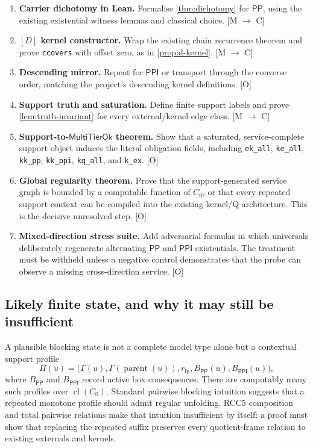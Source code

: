 \documentclass[11pt,letterpaper]{article}
\newcommand{\PP}{\ensuremath{\mathsf{PP}}}
\newcommand{\PPI}{\ensuremath{\mathsf{PPI}}}
\newcommand{\cl}{\operatorname{cl}}
\newcommand{\MultiTierOk}{\ensuremath{\mathsf{MultiTierOk}}}
\newcommand{\code}[1]{\nolinkurl{#1}}
\theoremstyle{definition}
\theoremstyle{plain}
\theoremstyle{remark}
\begin{document}
\begin{enumerate}
  \item \textbf{Carrier dichotomy in Lean.}  Formalise
        \cref{thm:dichotomy} for $\PP$, using the existing existential witness
        lemmas and classical choice. [M $\rightarrow$ C]
  \item \textbf{$[D]$ kernel constructor.}  Wrap the existing chain recurrence
        theorem and prove \code{ccovers} with offset zero, as in
        \cref{prop:d-kernel}. [M $\rightarrow$ C]
  \item \textbf{Descending mirror.}  Repeat for $\PPI$ or transport through the
        converse order, matching the project's descending kernel definitions.
        [O]
  \item \textbf{Support truth and saturation.}  Define finite support labels and
        prove \cref{lem:truth-invariant} for every external/kernel edge class.
        [M $\rightarrow$ C]
  \item \textbf{Support-to-\MultiTierOk{} theorem.}  Show that a saturated,
        service-complete support object induces the literal obligation fields,
        including \code{ek_all}, \code{ke_all}, \code{kk_pp},
        \code{kk_ppi}, \code{kq_all}, and \code{k_ex}. [O]
  \item \textbf{Global regularity theorem.}  Prove that the support-generated
        service graph is bounded by a computable function of $C_0$, or that every
        repeated support context can be compiled into the existing kernel/Q
        architecture.  This is the decisive unresolved step. [O]
  \item \textbf{Mixed-direction stress suite.}  Add adversarial formulas in
        which universals deliberately regenerate alternating $\PP$ and $\PPI$
        existentials.  The treatment must be withheld unless a negative control
        demonstrates that the probe can observe a missing cross-direction
        service. [O]
\end{enumerate}

\subsection{Likely finite state, and why it may still be insufficient}

A plausible blocking state is not a complete model type alone but a contextual
support profile
\[
  \Pi(u)=
  \bigl(\Gamma(u),\Gamma(\operatorname{parent}(u)),r_{\mathrm{in}},
        B_{\PP}(u),B_{\PPI}(u)\bigr),
\]
where $B_{\PP}$ and $B_{\PPI}$ record active box consequences.  There are
computably many such profiles over $\cl(C_0)$.  Standard pairwise blocking
intuition suggests that a repeated monotone profile should admit regular
unfolding.  RCC5 composition and total pairwise relations make that intuition
insufficient by itself: a proof must show that replacing the repeated suffix
preserves every quotient-frame relation to existing externals and kernels.
\end{document}
